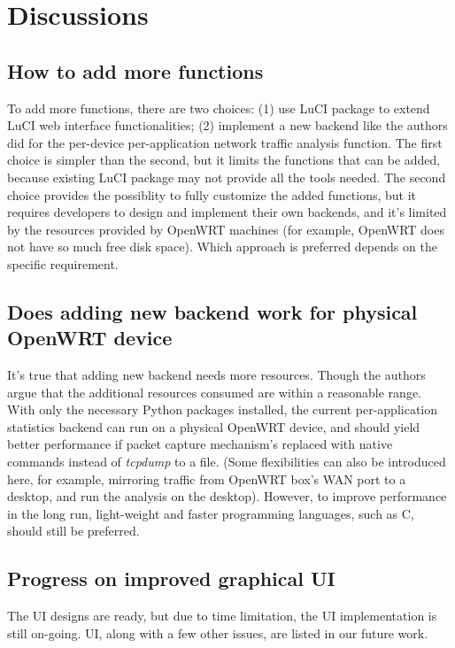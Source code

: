 \section{Discussions}

\subsection{How to add more functions}
To add more functions, there are two choices: (1) use LuCI package to extend LuCI web interface functionalities; (2) implement a new backend like the authors did for the per-device per-application network traffic analysis function. The first choice is simpler than the second, but it limits the functions that can be added, because existing LuCI package may not provide all the tools needed. The second choice provides the possiblity to fully customize the added functions, but it requires developers to design and implement their own backends, and it's limited by the resources provided by OpenWRT machines (for example, OpenWRT does not have so much free disk space). Which approach is preferred depends on the specific requirement.

\subsection{Does adding new backend work for physical OpenWRT device}

It's true that adding new backend needs more resources. Though the authors argue that the additional resources consumed are within a reasonable range. With only the necessary Python packages installed, the current per-application statistics backend can run on a physical OpenWRT device, and should yield better performance if packet capture mechanism's replaced with native commands instead of \textit{tcpdump} to a file. (Some flexibilities can also be introduced here, for example, mirroring traffic from OpenWRT box's WAN port to a desktop, and run the analysis on the desktop). However, to improve performance in the long run, light-weight and faster programming languages, such as C, should still be preferred.

\subsection{Progress on improved graphical UI}

The UI designs are ready, but due to time limitation, the UI implementation is still on-going. UI, along with a few other issues, are listed in our future work.